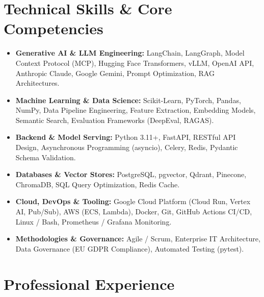 \documentclass[a4paper,10pt]{article}
\begin{document}
\section{Technical Skills \& Core Competencies}
\begin{itemize}[leftmargin=1.2em, itemsep=2pt]
  \item \textbf{Generative AI \& LLM Engineering:} LangChain, LangGraph, Model Context Protocol (MCP), Hugging Face Transformers, vLLM, OpenAI API, Anthropic Claude, Google Gemini, Prompt Optimization, RAG Architectures.
  \item \textbf{Machine Learning \& Data Science:} Scikit-Learn, PyTorch, Pandas, NumPy, Data Pipeline Engineering, Feature Extraction, Embedding Models, Semantic Search, Evaluation Frameworks (DeepEval, RAGAS).
  \item \textbf{Backend \& Model Serving:} Python 3.11+, FastAPI, RESTful API Design, Asynchronous Programming (asyncio), Celery, Redis, Pydantic Schema Validation.
  \item \textbf{Databases \& Vector Stores:} PostgreSQL, pgvector, Qdrant, Pinecone, ChromaDB, SQL Query Optimization, Redis Cache.
  \item \textbf{Cloud, DevOps \& Tooling:} Google Cloud Platform (Cloud Run, Vertex AI, Pub/Sub), AWS (ECS, Lambda), Docker, Git, GitHub Actions CI/CD, Linux / Bash, Prometheus / Grafana Monitoring.
  \item \textbf{Methodologies \& Governance:} Agile / Scrum, Enterprise IT Architecture, Data Governance (EU GDPR Compliance), Automated Testing (pytest).
\end{itemize}

\section{Professional Experience}
\end{document}
